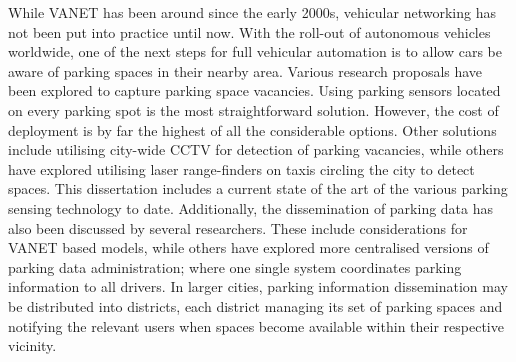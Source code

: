 
While \ac{VANET} has been around since the early 2000s, vehicular networking has not been put into practice until now. With the roll-out of autonomous vehicles worldwide, one of the next steps for full vehicular automation is to allow cars be aware of parking spaces in their nearby area. Various research proposals have been explored to capture parking space vacancies. Using parking sensors located on every parking spot is the most straightforward solution. However, the cost of deployment is by far the highest of all the considerable options. Other solutions include utilising city-wide \ac{CCTV} for detection of parking vacancies, while others have explored utilising laser range-finders on taxis circling the city to detect spaces. This dissertation includes a current state of the art of the various parking sensing technology to date. Additionally, the dissemination of parking data has also been discussed by several researchers. These include considerations for \ac{VANET} based models, while others have explored more centralised versions of parking data administration; where one single system coordinates parking information to all drivers. In larger cities, parking information dissemination may be distributed into districts, each district managing its set of parking spaces and notifying the relevant users when spaces become available within their respective vicinity.\\